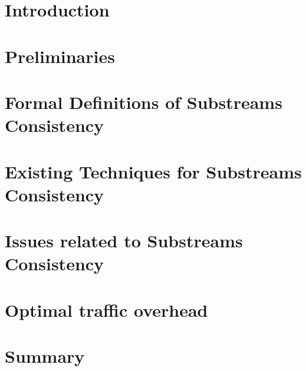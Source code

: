 \section{Introduction}

\section{Preliminaries}

\section{Formal Definitions of Substreams Consistency}

\section{Existing Techniques for Substreams Consistency}

\section{Issues related to Substreams Consistency}

\section{Optimal traffic overhead}

\section{Summary}